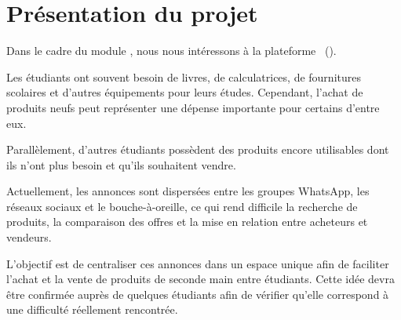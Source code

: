 ﻿\chapter{Présentation du projet}

Dans le cadre du module \module, nous nous intéressons à la plateforme \nomProjet\ (\intitule).

Les étudiants ont souvent besoin de livres, de calculatrices, de fournitures scolaires et d'autres équipements pour leurs études. Cependant, l'achat de produits neufs peut représenter une dépense importante pour certains d'entre eux.

Parallèlement, d'autres étudiants possèdent des produits encore utilisables dont ils n'ont plus besoin et qu'ils souhaitent vendre.

Actuellement, les annonces sont dispersées entre les groupes WhatsApp, les réseaux sociaux et le bouche-à-oreille, ce qui rend difficile la recherche de produits, la comparaison des offres et la mise en relation entre acheteurs et vendeurs.

L'objectif est de centraliser ces annonces dans un espace unique afin de faciliter l'achat et la vente de produits de seconde main entre étudiants. Cette idée devra être confirmée auprès de quelques étudiants afin de vérifier qu'elle correspond à une difficulté réellement rencontrée.
